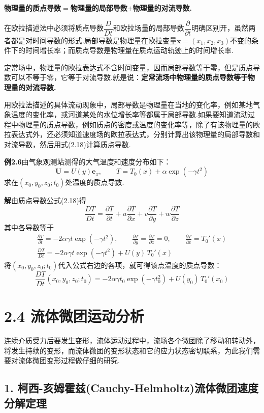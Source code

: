 \textbf{物理量的质点导数$=$物理量的局部导数$+$物理量的对流导数.}

在欧拉描述法中必须将质点导数$\dfrac{D}{Dt}$和欧拉场量的局部导数$\dfrac{\partial}{\partial t}$明确区别开，虽然两者都是对时间导数的形式.局部导数是物理量在欧拉变量$\boldsymbol{x}=(x_1,x_2,x_3)$不变的条件下的时间增长率；而质点导数是物理量在质点运动轨迹上的时间增长率.

定常场中，物理量的欧拉表达式不含时间变量，因而局部导数等于零，但是质点导数可以不等于零，它等于对流导数.就是说：\textbf{定常流场中物理量的质点导数等于物理量的对流导数.}

用欧拉法描述的具体流动现象中，局部导数是物理量在当地的变化率，例如某地气象温度的变化率，或河道某处的水位增长率等都属于局部导数.如果要知道流动过程中物理量的质点导数，例如质点的密度或温度的变化率等，除了有该物理量的欧拉表达式外，还必须知道速度场的欧拉表达式，分别计算出该物理量的局部导数和对流导数，然后用式(2.18)计算质点导数.

\noindent\textbf{例2.6}\quad 由气象观测站测得的大气温度和速度分布如下：
\[
\boldsymbol{U}=U(y)\boldsymbol{e}_x,\qquad T=T_0(x)+\alpha\exp(-\gamma t^{2})
\]
求在$(x_0,y_0,z_0;t_0)$处温度的质点导数.

\noindent\textbf{解}\quad 由质点导数公式(2.18)得
\[
\frac{DT}{Dt}=\frac{\partial T}{\partial t}+u\frac{\partial T}{\partial x}+v\frac{\partial T}{\partial y}+w\frac{\partial T}{\partial z}
\]
其中各导数等于
\begin{gather*}
\frac{\partial T}{\partial t}=-2\alpha\gamma t\exp(-\gamma t^{2}),\qquad \frac{\partial T}{\partial y}=\frac{\partial T}{\partial z}=0,\qquad \frac{\partial T}{\partial x}=T_0'(x)\\[4pt]
\frac{DT}{Dt}=-2\alpha\gamma t\exp(-\gamma t^{2})+U(y)\,T_0'(x)
\end{gather*}
将$(x_0,y_0,z_0;t_0)$代入公式右边的各项，就可得该点温度的质点导数：
\[
\frac{DT}{Dt}(x_0,y_0,z_0;t_0)=-2\alpha\gamma t_0\exp(-\gamma t_0^{2})+U(y_0)\,T_0'(x_0)
\]
\section*{2.4  流体微团运动分析}

连续介质受力后要发生变形，流体运动过程中，流场各个微团除了移动和转动外，将发生持续的变形，而流体微团的变形状态和它的应力状态密切联系，为此我们需要对流体微团变形过程做仔细的研究.

\subsection*{1. 柯西-亥姆霍兹(Cauchy-Helmholtz)流体微团速度分解定理}

